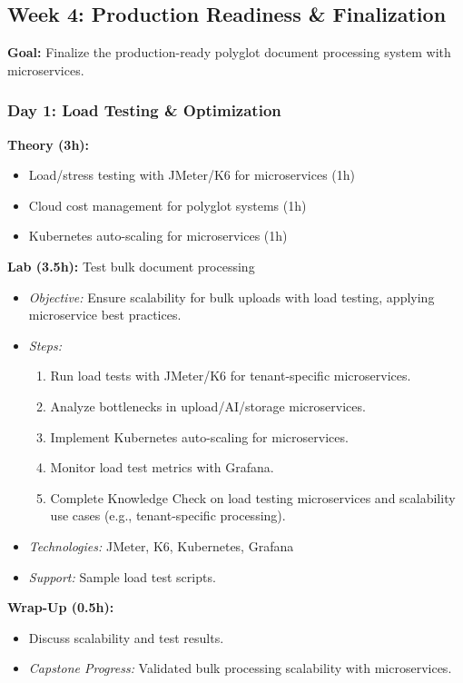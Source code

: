\documentclass[11pt]{article}
\begin{document}
\subsection{Week 4: Production Readiness \& Finalization}
\textbf{Goal:} Finalize the production-ready polyglot document processing system with microservices.

\subsubsection{Day 1: Load Testing \& Optimization}
\textbf{Theory (3h):}
\begin{itemize}
    \item Load/stress testing with JMeter/K6 for microservices (1h)
    \item Cloud cost management for polyglot systems (1h)
    \item Kubernetes auto-scaling for microservices (1h)
\end{itemize}
\textbf{Lab (3.5h):} Test bulk document processing
\begin{itemize}
    \item \textit{Objective:} Ensure scalability for bulk uploads with load testing, applying microservice best practices.
    \item \textit{Steps:}
        \begin{enumerate}
            \item Run load tests with JMeter/K6 for tenant-specific microservices.
            \item Analyze bottlenecks in upload/AI/storage microservices.
            \item Implement Kubernetes auto-scaling for microservices.
            \item Monitor load test metrics with Grafana.
            \item Complete Knowledge Check on load testing microservices and scalability use cases (e.g., tenant-specific processing).
        \end{enumerate}
    \item \textit{Technologies:} JMeter, K6, Kubernetes, Grafana
    \item \textit{Support:} Sample load test scripts.
\end{itemize}
\textbf{Wrap-Up (0.5h):}
\begin{itemize}
    \item Discuss scalability and test results.
    \item \textit{Capstone Progress:} Validated bulk processing scalability with microservices.
\end{itemize}
\end{document}
